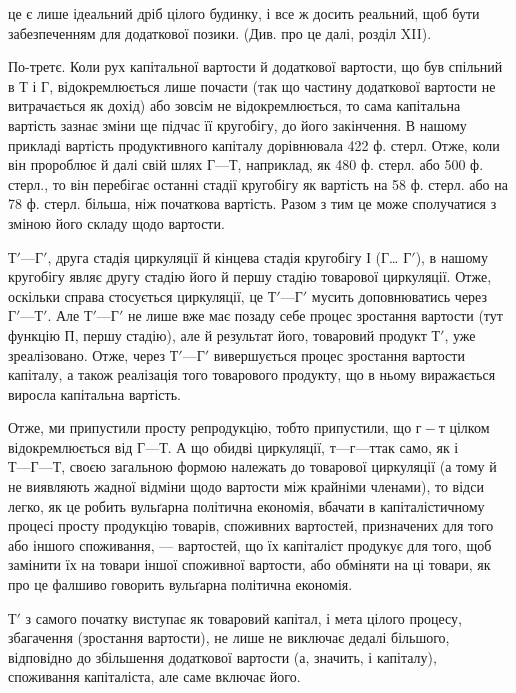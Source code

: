 \parcont{}  %
це є лише ідеальний дріб цілого будинку, і все ж досить реальний, щоб
бути забезпеченням для додаткової позики. (Див. про це далі, розділ XII).

По-третє. Коли рух капітальної вартости й додаткової вартости, що
був спільний в Т і Г, відокремлюється лише почасти (так що частину
додаткової вартости не витрачається як дохід) або зовсім не відокремлюється,
то сама капітальна вартість зазнає зміни ще підчас її кругобігу,
до його закінчення. В нашому прикладі вартість продуктивного капіталу
дорівнювала 422 ф. стерл. Отже, коли він пророблює й далі свій шлях
$Г — Т$, наприклад, як 480 ф. стерл. або 500 ф. стерл., то він перебігає
останні стадії кругобігу як вартість на 58 ф. стерл. або на 78 ф. стерл.
більша, ніж початкова вартість. Разом з тим це може сполучатися з зміною
його складу щодо вартости.

$Т' — Г'$, друга стадія циркуляції й кінцева стадія кругобігу І (Г\dots{} $Г'$),
в нашому кругобігу являє другу стадію його й першу стадію товарової
циркуляції. Отже, оскільки справа стосується циркуляції, це $Т' — Г'$ мусить
доповнюватись через $Г' — Т'$. Але $Т' — Г'$ не лише вже має позаду себе процес
зростання вартости (тут функцію П, першу стадію), але й результат його,
товаровий продукт $Т'$, уже зреалізовано. Отже, через $Т' — Г'$ вивершується
процес зростання вартости капіталу, а також реалізація того товарового продукту,
що в ньому виражається виросла капітальна вартість.

Отже, ми припустили просту репродукцію, тобто припустили, що
$г-т$ цілком відокремлюється від $Г — Т$. А що обидві циркуляції,
$т — г — т т$ак само, як і $Т — Г — Т$, своєю загальною формою належать
до товарової циркуляції (а тому й не виявляють жадної відміни щодо
вартости між крайніми членами), то відси легко, як це робить вульґарна
політична економія, вбачати в капіталістичному процесі просту
продукцію товарів, споживних вартостей, призначених для того або іншого
споживання, — вартостей, що їх капіталіст продукує для того, щоб замінити
їх на товари іншої споживної вартости, або обміняти на ці товари, як
про це фалшиво говорить вульґарна політична економія.

$Т'$ з самого початку виступає як товаровий капітал, і мета цілого
процесу, збагачення (зростання вартости), не лише не виключає дедалі
більшого, відповідно до збільшення додаткової вартости (а, значить, і
капіталу), споживання капіталіста, але саме включає його.

